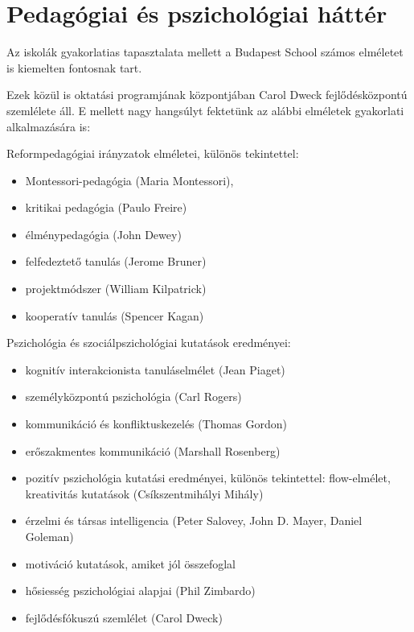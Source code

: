 \section{Pedagógiai és pszichológiai háttér}

Az iskolák gyakorlatias tapasztalata mellett a Budapest School számos
elméletet is kiemelten fontosnak tart.

Ezek közül is oktatási programjának központjában Carol Dweck
fejlődésközpontú szemlélete áll. E mellett nagy hangsúlyt fektetünk az
alábbi elméletek gyakorlati alkalmazására is:

Reformpedagógiai irányzatok elméletei, különös tekintettel:

\begin{itemize}

      \item
            Montessori-pedagógia (Maria Montessori),
      \item
            kritikai pedagógia (Paulo Freire)
      \item
            élménypedagógia (John Dewey)
      \item
            felfedeztető tanulás (Jerome Bruner)
      \item
            projektmódszer (William Kilpatrick)
      \item
            kooperatív tanulás (Spencer Kagan)
\end{itemize}

Pszichológia és szociálpszichológiai kutatások eredményei:

\begin{itemize}

      \item
            kognitív interakcionista tanuláselmélet (Jean Piaget)
      \item
            személyközpontú pszichológia (Carl Rogers)
      \item
            kommunikáció és konfliktuskezelés (Thomas Gordon)
      \item
            erőszakmentes kommunikáció (Marshall Rosenberg)
      \item
            pozitív pszichológia kutatási eredményei, különös tekintettel:
            flow-elmélet, kreativitás kutatások (Csíkszentmihályi Mihály)
      \item
            érzelmi és társas intelligencia (Peter Salovey, John D. Mayer,
            Daniel
            Goleman)
      \item motiváció kutatások, amiket jól összefoglal \citep{pink2011drive}
      \item
            hősiesség pszichológiai alapjai (Phil Zimbardo)
      \item
            fejlődésfókuszú szemlélet (Carol Dweck)
\end{itemize}

